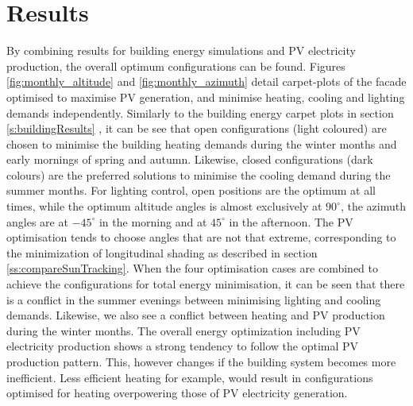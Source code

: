 \chapter{Results}
\label{ch:results}



By combining results for building energy simulations and PV electricity production, the overall optimum configurations can be found. Figures \ref{fig:monthly_altitude} and \ref{fig:monthly_azimuth} detail carpet-plots of the facade optimised to maximise PV generation, and minimise heating, cooling and lighting demands independently. Similarly to the building energy carpet plots in section \ref{s:buildingResults} , it can be see that open configurations (light coloured) are chosen to minimise the building heating demands during the winter months and early mornings of spring and autumn. Likewise, closed configurations (dark colours) are the preferred solutions to minimise the cooling demand during the summer months. For lighting control, open positions are the optimum at all times, while the optimum altitude angles is almost exclusively at $90^{\circ}$, the azimuth angles are at $-45^{\circ}$ in the morning and at $45^{\circ}$  in the afternoon. The PV optimisation tends to choose angles that are not that extreme, corresponding to the minimization of longitudinal shading as described in section \ref{ss:compareSunTracking}. When the four optimisation cases are combined to achieve the configurations for total energy minimisation, it can be seen that there is a conflict in the summer evenings between minimising lighting and cooling demands. Likewise, we also see a conflict between heating and PV production during the winter months. The overall energy optimization including PV electricity production shows a strong tendency to follow the optimal PV production pattern. This, however changes if the building system becomes more inefficient. Less efficient heating for example, would result in configurations optimised for heating overpowering those of PV electricity generation.




